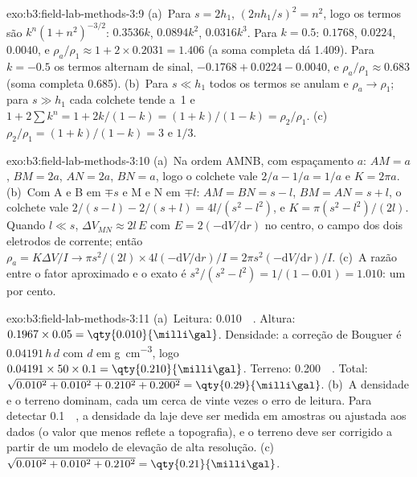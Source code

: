 \begin{solution}{exo:b3:field-lab-methods-3:9}
(a)~Para $s = 2h_1$, $(2nh_1/s)^2 = n^2$, logo os termos são $k^n(1 +
n^2)^{-3/2}$: $0.3536k$, $0.0894k^2$, $0.0316k^3$. Para $k = 0.5$:
$\num{0.1768}$, $\num{0.0224}$, $\num{0.0040}$, e $\rho_a/\rho_1 \approx
1 + 2\times0.2031 = \num{1.406}$ (a soma completa dá \num{1.409}). Para $k
= -0.5$ os termos alternam de sinal, $-0.1768 + 0.0224 - 0.0040$, e
$\rho_a/\rho_1 \approx \num{0.683}$ (soma completa \num{0.685}). (b)~Para $s \ll
h_1$ todos os termos se anulam e $\rho_a \to \rho_1$; para $s \gg h_1$ cada
colchete tende a~1 e $1 + 2\sum k^n = 1 + 2k/(1 - k) = (1 + k)/(1 -
k) = \rho_2/\rho_1$. (c)~$\rho_2/\rho_1 = (1 + k)/(1 - k) = 3$ e $1/3$.
\end{solution}

\begin{solution}{exo:b3:field-lab-methods-3:10}
(a)~Na ordem AMNB, com espaçamento $a$: $AM = a$, $BM = 2a$, $AN = 2a$,
$BN = a$, logo o colchete vale $2/a - 1/a = 1/a$ e $K = 2\pi a$.
(b)~Com A e B em $\mp s$ e M e N em $\mp l$: $AM = BN = s - l$,
$BM = AN = s + l$, o colchete vale $2/(s - l) - 2/(s + l) = 4l/(s^2 -
l^2)$, e $K = \pi(s^2 - l^2)/(2l)$. Quando $l \ll s$, $\Delta V_{MN}
\approx 2l\,E$ com $E = 2(-\mathrm{d}V/\mathrm{d}r)$ no centro, o
campo dos dois eletrodos de corrente; então $\rho_a = K\Delta V/I \to
\pi s^2/(2l)\times 4l(-\mathrm{d}V/\mathrm{d}r)/I = 2\pi s^2(-
\mathrm{d}V/\mathrm{d}r)/I$. (c)~A razão entre o fator aproximado e o
exato é $s^2/(s^2 - l^2) = 1/(1 - 0.01) = 1.010$: um por cento.
\end{solution}

\begin{solution}{exo:b3:field-lab-methods-3:11}
(a)~Leitura: \qty{0.010}{\milli\gal}. Altura:
$0.1967\times0.05 = \qty{0.010}{\milli\gal}$. Densidade: a correção de Bouguer
é $0.04191\,h\,d$ com $d$ em \unit{g.cm^{-3}}, logo
$0.04191\times50\times0.1 = \qty{0.210}{\milli\gal}$. Terreno:
\qty{0.200}{\milli\gal}. Total: $\sqrt{0.010^2 + 0.010^2 + 0.210^2 +
0.200^2} = \qty{0.29}{\milli\gal}$. (b)~A densidade e o terreno
dominam, cada um cerca de vinte vezes o erro de leitura. Para detectar
\qty{0.1}{\milli\gal}, a densidade da laje deve ser medida em
amostras ou ajustada aos dados (o valor que menos reflete a
topografia), e o terreno deve ser corrigido a partir de um modelo de elevação de alta resolução.
(c)~$\sqrt{0.010^2 + 0.010^2 + 0.210^2} = \qty{0.21}{\milli\gal}$.
\end{solution}

